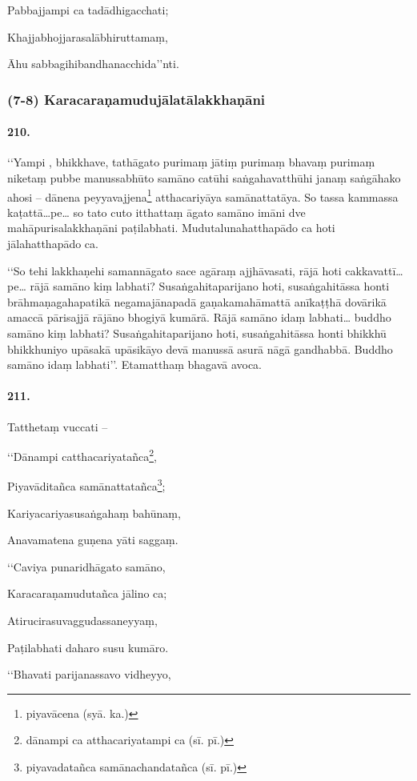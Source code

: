 Pabbajjampi ca tadādhigacchati;

Khajjabhojjarasalābhiruttamaṃ,

Āhu sabbagihibandhanacchida’’nti.

\subsubsection{(7-8) Karacaraṇamudujālatālakkhaṇāni}

\paragraph{210.} ‘‘Yampi , bhikkhave, tathāgato purimaṃ jātiṃ purimaṃ bhavaṃ purimaṃ niketaṃ pubbe manussabhūto samāno catūhi saṅgahavatthūhi janaṃ saṅgāhako ahosi – dānena peyyavajjena\footnote{piyavācena (syā. ka.)} atthacariyāya samānattatāya. So tassa kammassa kaṭattā…pe… so tato cuto itthattaṃ āgato samāno imāni dve mahāpurisalakkhaṇāni paṭilabhati. Mudutalunahatthapādo ca hoti jālahatthapādo ca.

‘‘So tehi lakkhaṇehi samannāgato sace agāraṃ ajjhāvasati, rājā hoti cakkavattī…pe… rājā samāno kiṃ labhati? Susaṅgahitaparijano hoti, susaṅgahitāssa honti brāhmaṇagahapatikā negamajānapadā gaṇakamahāmattā anīkaṭṭhā dovārikā amaccā pārisajjā rājāno bhogiyā kumārā. Rājā samāno idaṃ labhati… buddho samāno kiṃ labhati? Susaṅgahitaparijano hoti, susaṅgahitāssa honti bhikkhū bhikkhuniyo upāsakā upāsikāyo devā manussā asurā nāgā gandhabbā. Buddho samāno idaṃ labhati’’. Etamatthaṃ bhagavā avoca.

\paragraph{211.} Tatthetaṃ vuccati –

‘‘Dānampi catthacariyatañca\footnote{dānampi ca atthacariyatampi ca (sī. pī.)},

Piyavāditañca samānattatañca\footnote{piyavadatañca samānachandatañca (sī. pī.)};

Kariyacariyasusaṅgahaṃ bahūnaṃ,

Anavamatena guṇena yāti saggaṃ.

‘‘Caviya punaridhāgato samāno,

Karacaraṇamudutañca jālino ca;

Atirucirasuvaggudassaneyyaṃ,

Paṭilabhati daharo susu kumāro.

‘‘Bhavati parijanassavo vidheyyo,

